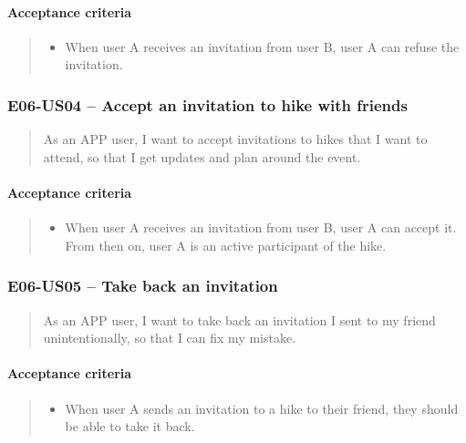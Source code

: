 \paragraph*{Acceptance criteria}
\begin{quote}
\begin{itemize}
    \item When user A receives an invitation from user B, user A can refuse the invitation.
\end{itemize}
\end{quote}

\subsubsection*{E06-US04 -- Accept an invitation to hike with friends}
\begin{quote}
As an APP user, I want to accept invitations to hikes that I want to attend, so that I get updates and plan around the event.
\end{quote}

\paragraph*{Acceptance criteria}
\begin{quote}
\begin{itemize}
    \item When user A receives an invitation from user B, user A can accept it. From then on, user A is an active participant of the hike.
\end{itemize}
\end{quote}

\subsubsection*{E06-US05 -- Take back an invitation}
\begin{quote}
As an APP user, I want to take back an invitation I sent to my friend unintentionally, so that I can fix my mistake.
\end{quote}

\paragraph*{Acceptance criteria}
\begin{quote}
\begin{itemize}
    \item When user A sends an invitation to a hike to their friend, they should be able to take it back.
\end{itemize}
\end{quote}

